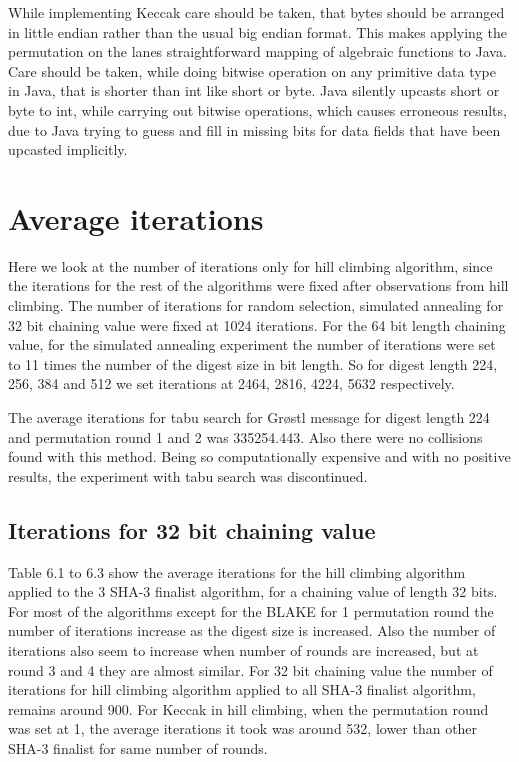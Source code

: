 While implementing Keccak care should be taken, that bytes should be arranged in little endian rather than the
usual big endian format. This makes applying the permutation on the lanes straightforward mapping of algebraic
functions to Java. Care should be taken, while doing bitwise operation on any primitive data type in Java, that
is shorter than int like short or byte. Java silently upcasts short or byte to int, while carrying out bitwise
operations, which causes erroneous results, due to Java trying to guess and fill in missing bits for data fields
that have been upcasted implicitly.

\section{Average iterations}

Here we look at the number of iterations only for hill climbing algorithm, since the iterations for the rest of
the algorithms were fixed after observations from hill climbing. The number of iterations for random selection, simulated
annealing for 32 bit chaining value were fixed at 1024 iterations. For the 64 bit length chaining value, for the
simulated annealing experiment the number of iterations were set to 11 times the number of the digest size in bit
length. So for digest length 224, 256, 384 and 512 we set iterations at 2464, 2816, 4224, 5632 respectively. 

The average iterations for tabu search for Gr{\o}stl message for digest length 224 and permutation round 1 and 2
was 335254.443. Also there were no collisions found with this method. Being so computationally expensive and with
no positive results, the experiment with tabu search was discontinued.

\subsection{Iterations for 32 bit chaining value}

Table 6.1 to 6.3 show the average iterations for the hill climbing algorithm applied to the 3 SHA-3 finalist algorithm,
for a chaining value of length 32 bits. For most of the algorithms except for the BLAKE for 1 permutation round
the number of iterations increase as the digest size is increased. Also the number of iterations also seem to
increase when number of rounds are increased, but at round 3 and 4 they are almost similar. For 32 bit chaining value
the number of iterations for hill climbing algorithm applied to all SHA-3 finalist algorithm, remains around 900.
For Keccak in hill climbing, when the permutation round was set at 1, the average iterations it took was around 532,
lower than other SHA-3 finalist for same number of rounds.


